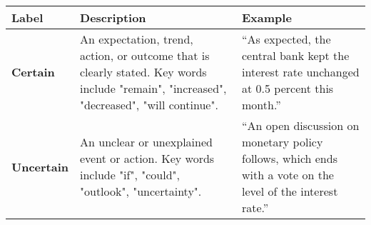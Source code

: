 \begin{table*}
    \caption{}
    \vspace{1em}
    \begin{tabular}{p{}p{}p{}}
    \toprule
    \textbf{Label} & \textbf{Description} & \textbf{Example} \\
    \midrule
    \textbf{Certain} & An expectation, trend, action, or outcome that is clearly stated. Key words include "remain", "increased", "decreased", "will continue". & “As expected, the central bank kept the interest rate unchanged at 0.5 percent this month.” \\
    \midrule
    \textbf{Uncertain} & An unclear or unexplained event or action. Key words include "if", "could", "outlook", "uncertainty". & “An open discussion on monetary policy follows, which ends with a vote on the level of the interest rate.” \\
    \bottomrule
    \end{tabular}
    \label{tb:boi_certainty_guide}
\end{table*}